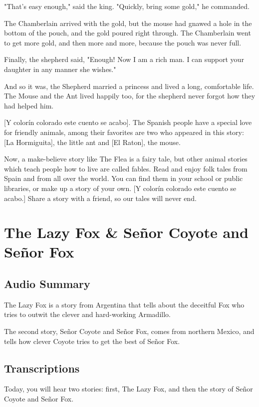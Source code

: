 "That's easy enough," said the king. "Quickly, bring some gold," he commanded.

The Chamberlain arrived with the gold, but the mouse had gnawed a hole in the bottom of the pouch, and the gold poured right through. The Chamberlain went to get more gold, and then more and more, because the pouch was never full.

Finally, the shepherd said, "Enough! Now I am a rich man. I can support your daughter in any manner she wishes."

And so it was, the Shepherd married a princess and lived a long, comfortable life. The Mouse and the Ant lived happily too, for the shepherd never forgot how they had helped him.

    [Y colorín colorado este cuento se acabo]. The Spanish people have a special love for friendly animals, among their favorites are two who appeared in this story: [La Hormiguita], the little ant and [El Raton], the mouse.

Now, a make-believe story like The Flea is a fairy tale, but other animal stories which teach people how to live are called fables. Read and enjoy folk tales from Spain and from all over the world. You can find them in your school or public libraries, or make up a story of your own. [Y colorín colorado este cuento se acabo.] Share a story with a friend, so our tales will never end.

\section{The Lazy Fox \& Señor Coyote and Señor Fox}

\subsection{Audio Summary}

The Lazy Fox is a story from Argentina that tells about the deceitful Fox who tries to outwit the clever and hard-working Armadillo.

The second story, Señor Coyote and Señor Fox, comes from northern Mexico, and tells how clever Coyote tries to get the best of Señor Fox.

\subsection{Transcriptions}

Today, you will hear two stories: first, The Lazy Fox, and then the story of Señor Coyote and Señor Fox.

